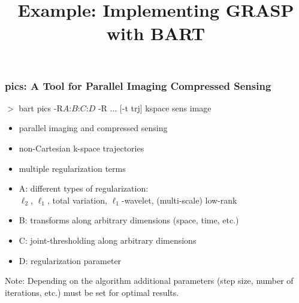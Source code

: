 \documentclass{beamer}
\title{\large Example: Implementing GRASP with BART}
\begin{document}
\frame{\titlepage}








\begin{frame}
\frametitle{pics: A Tool for Parallel Imaging Compressed Sensing}

$>$ bart pics {\color{violet}-R}{\color{yellow}$A$}:{\color{blue}$B$}:{\color{cyan}$C$}:{\color{pink}$D$}
	{\color{violet}-R} ... {\color{red}[-t trj]} kspace {\color{green}sens} image

\vspace{0.5cm}
\begin{itemize}
\item {\color{green}parallel imaging} and compressed sensing
\item {\color{red}non-Cartesian k-space trajectories}
\item {\color{violet}multiple regularization terms}
\item {\color{yellow}A:} different {\color{yellow}types of regularization}: \\
		$\ell_2$, $\ell_1$, total variation,  $\ell_1$-wavelet, (multi-scale) low-rank
\item {\color{blue}B: transforms} along {\color{blue}arbitrary dimensions} (space, time, etc.)
\item {\color{cyan}C: joint-thresholding} along arbitrary dimensions
\item {\color{pink}D: regularization parameter}
\end{itemize}

\vfill
{\small
Note: Depending on the algorithm additional parameters (step size, number of iterations, etc.)
must be set for optimal results.}

\end{frame}
\end{document}

